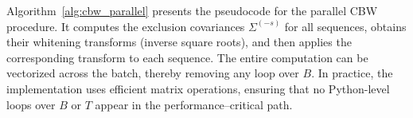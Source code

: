 Algorithm~\ref{alg:cbw_parallel} presents the pseudocode for the parallel CBW procedure. 
It computes the exclusion covariances $\Sigma^{(-s)}$ for all sequences, obtains their 
whitening transforms (inverse square roots), and then applies the corresponding transform 
to each sequence.
The entire computation can be vectorized across the batch, thereby 
removing any loop over $B$.
In practice, the implementation uses efficient matrix operations, ensuring that no Python-level loops over $B$ or $T$ appear in the performance–critical path.

